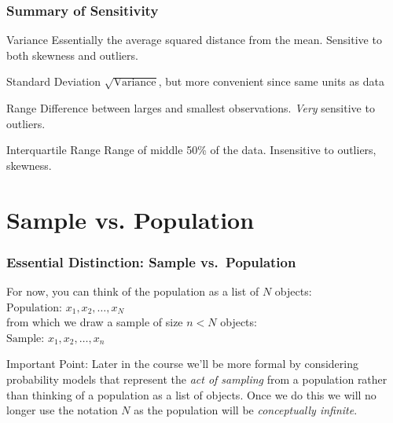 \documentclass{beamer}
\begin{document}
\begin{frame}
\frametitle{Summary of Sensitivity}
	\begin{block}{Variance}
		Essentially the average squared distance from the mean. Sensitive to both skewness and 			outliers.
	\end{block}
	\begin{block}{Standard Deviation}
		$\sqrt{\mbox{Variance}}$, but more convenient since \alert{same units as data}
	\end{block}
	\begin{block}{Range}
		Difference between larges and smallest observations. \emph{Very} sensitive to outliers. 		
	\end{block}
	\begin{block}{Interquartile Range}
		Range of middle 50\% of the data. Insensitive to outliers, skewness. 
	\end{block}
\end{frame}

\section{Sample vs. Population}
\begin{frame}
\frametitle{Essential Distinction: Sample vs.\ Population}
	For now, you can think of the population as a list of $N$ objects:\\
		\alert{$\mbox{Population: }x_1, x_2, \hdots, x_N$}\\
	from which we draw a sample of size $n<N$ objects:\\
		\alert{$\mbox{Sample: } x_1, x_2, \hdots, x_n$}
	\vspace{3em}
	\begin{alertblock}{Important Point:}
		Later in the course we'll be more formal by considering \alert{probability models} that 				represent the \alert{\emph{act of sampling}} from a population rather than thinking of a 				population as a list of objects. Once we do this we will no longer use the notation $N$ as 			the population will be \alert{\emph{conceptually infinite}}.
	\end{alertblock}
\end{frame}
\end{document}
